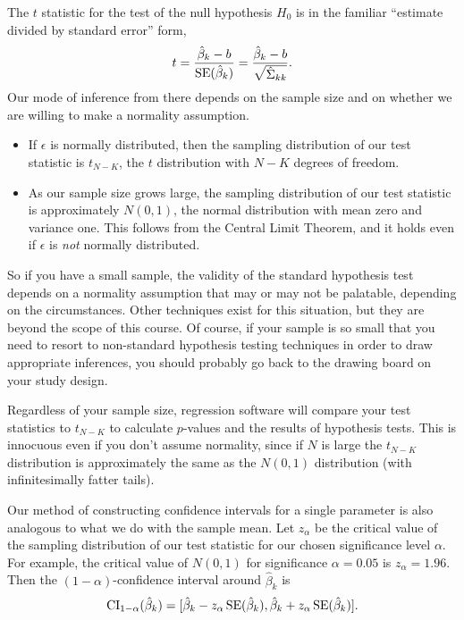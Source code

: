 \documentclass[12pt,oneside,openany]{book}
\begin{document}
The \(t\) statistic for the test of the null hypothesis \(H_0\) is in
the familiar ``estimate divided by standard error'' form, \[
t = \frac{\hat{\beta}_k - b}{\mathop{\rm SE}\nolimits(\hat{\beta}_k)} = \frac{\hat{\beta}_k - b}{\sqrt{\hat{\Sigma}_{kk}}}.
\] Our mode of inference from there depends on the sample size and on
whether we are willing to make a normality assumption.

\begin{itemize}
\item
  If \(\epsilon\) is normally distributed, then the sampling
  distribution of our test statistic is \(t_{N - K}\), the \(t\)
  distribution with \(N - K\) degrees of freedom.
\item
  As our sample size grows large, the sampling distribution of our test
  statistic is approximately \(N(0, 1)\), the normal distribution with
  mean zero and variance one. This follows from the Central Limit
  Theorem, and it holds even if \(\epsilon\) is \emph{not} normally
  distributed.
\end{itemize}

So if you have a small sample, the validity of the standard hypothesis
test depends on a normality assumption that may or may not be palatable,
depending on the circumstances. Other techniques exist for this
situation, but they are beyond the scope of this course. Of course, if
your sample is so small that you need to resort to non-standard
hypothesis testing techniques in order to draw appropriate inferences,
you should probably go back to the drawing board on your study design.

Regardless of your sample size, regression software will compare your
test statistics to \(t_{N - K}\) to calculate \(p\)-values and the
results of hypothesis tests. This is innocuous even if you don't assume
normality, since if \(N\) is large the \(t_{N - K}\) distribution is
approximately the same as the \(N(0, 1)\) distribution (with
infinitesimally fatter tails).

Our method of constructing confidence intervals for a single parameter
is also analogous to what we do with the sample mean. Let \(z_{\alpha}\)
be the critical value of the sampling distribution of our test statistic
for our chosen significance level \(\alpha\). For example, the critical
value of \(N(0, 1)\) for significance \(\alpha = 0.05\) is
\(z_{\alpha} = 1.96\). Then the \((1 - \alpha)\)-confidence interval
around \(\hat{\beta}_k\) is \[
\mathop{\rm CI}\nolimits_{1 - \alpha}(\hat{\beta}_k) = [\hat{\beta}_k - z_{\alpha} \mathop{\rm SE}\nolimits(\hat{\beta}_k), \hat{\beta}_k + z_{\alpha} \mathop{\rm SE}\nolimits(\hat{\beta}_k)].
\]
\end{document}

